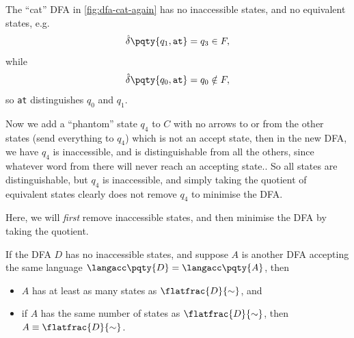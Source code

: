\begin{example*}
    The ``cat'' DFA in \autoref{fig:dfa-cat-again} has no inaccessible states, and no equivalent states, e.g.
    \[
        \hat{\delta} \pqty{q_1, \texttt{at}} = q_3 \in F,
    \]
    while
    \[
        \hat{\delta} \pqty{q_0, \texttt{at}} = q_0 \notin F,
    \]
    so \texttt{at} distinguishes \(q_0\) and \(q_1\).

    Now we add a ``phantom'' state \(q_4\) to \(C\) with no arrows to or from the other states (send everything to \(q_4\)) which is not an accept state, then in the new DFA, we have \(q_4\) is inaccessible, and is distinguishable from all the others, since whatever word from there will never reach an accepting state.. So all states are distinguishable, but \(q_4\) is inaccessible, and simply taking the quotient of equivalent states clearly does not remove \(q_4\) to minimise the DFA.
\end{example*}

Here, we will \emph{first} remove inaccessible states, and then minimise the DFA by taking the quotient.

\begin{theorem}
    \label{thm:minimal-dfa-is-unique}%
    If the DFA \(D\) has no inaccessible states, and suppose \(A\) is another DFA accepting the same language \(\langacc\pqty{D} = \langacc\pqty{A}\), then
    \begin{itemize}
        \item \(A\) has at least as many states as \(\flatfrac{D}{\sim}\), and
        \item if \(A\) has the same number of states as \(\flatfrac{D}{\sim}\), then \(A \equiv \flatfrac{D}{\sim}\).
    \end{itemize}
\end{theorem}


